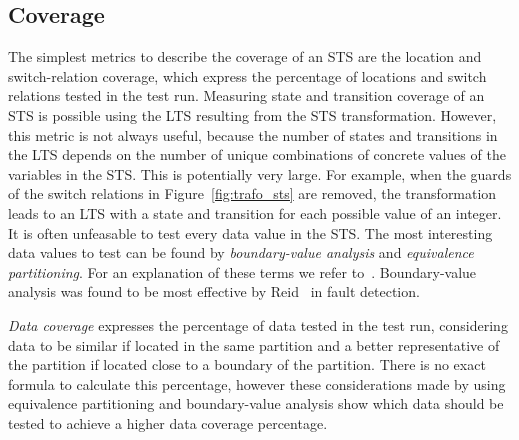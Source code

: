 \subsection{Coverage}\label{sec:sts_coverage}
The simplest metrics to describe the coverage of an STS are the location and switch-relation coverage, which express the percentage of locations and switch relations tested in the test run. Measuring state and transition coverage of an STS is possible using the LTS resulting from the STS transformation. However, this metric is not always useful, because the number of states and transitions in the LTS depends on the number of unique combinations of concrete values of the variables in the STS. This is potentially very large. For example, when the guards of the switch relations in Figure~\ref{fig:trafo_sts} are removed, the transformation leads to an LTS with a state and transition for each possible value of an integer. It is often unfeasable to test every data value in the STS. The most interesting data values to test can be found by \textit{boundary-value analysis} and \textit{equivalence partitioning}. For an explanation of these terms we refer to~\cite{Myers:2004}. Boundary-value analysis was found to be most effective by Reid~\cite{Reid:partitioning} in fault detection.

\textit{Data coverage} expresses the percentage of data tested in the test run, considering data to be similar if located in the same partition and a better representative of the partition if located close to a boundary of the partition. There is no exact formula to calculate this percentage, however these considerations made by using equivalence partitioning and boundary-value analysis show which data should be tested to achieve a higher data coverage percentage.
